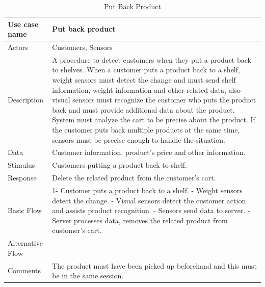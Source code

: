 \documentclass[11pt]{article}
\begin{document}
        
        
        \begin{table}[H]
        \begin{centering}
        \begin{tabular}{|p{2.5cm}|p{12cm}|}
        \hline
        
        Use case name & Put back product  \\ \hline
        Actors        & Customers, Sensors \\ \hline
        Description   & A procedure to detect customers when they put a product back to shelves. When a customer puts a product back to a shelf, weight sensors must detect the change and must send shelf information, weight information and other related data, also visual sensors must recognize the customer who puts the product back and must provide additional data about the product. System must analyze the cart to be precise about the product. If the customer puts back multiple products at the same time, sensors must be precise enough to handle the situation.\\ \hline
        Data          & Customer information, product's price and other information.  \\ \hline
        Stimulus      & Customers putting a product back to shelf. \\ \hline
        Response      & Delete the related product from the customer's cart. \\ \hline
        Basic Flow    & 
        1- Customer puts a product back to a shelf. \newline
        2- Weight sensors detect the change. \newline
        3- Visual sensors detect the customer action and assists product recognition. \newline
        4- Sensors send data to server. \newline
        5- Server processes data, removes the related product from customer's cart. \\ \hline
        Alternative
            Flow      & - \\ \hline
        Comments      & The product must have been picked up beforehand and this must be in the same session. \\ \hline
        
        \end{tabular}
        \caption{Put Back Product}
        \label{tab2}
        
        \end{centering}
        \end{table}    
        
\end{document}
